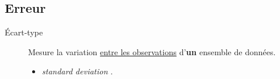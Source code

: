 \documentclass[french]{article}
\begin{document}
\begin{multicols*}{2}
\section{Erreur}\label{sec:SESDGLM}

\begin{description}
	\item[Écart-type]	Mesure la variation \underline{entre les observations} d'\textbf{un} ensemble de données.
		\begin{itemize}[leftmargin = *]
		\item	\og \textit{standard deviation} \fg{}.
		\end{itemize}
		\begin{center}
\begin{tikzpicture}[x=0.75pt,y=0.75pt,yscale=-1,xscale=1]


\end{tikzpicture}
\end{center}
\end{description}
\end{multicols*}
\end{document}
